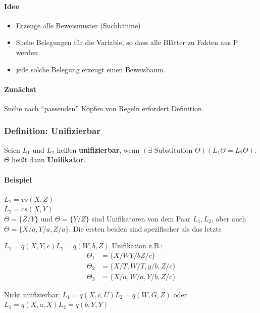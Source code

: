 \documentclass[12pt, a4paper]{article}
\begin{document}
\paragraph{Idee} 

\begin{itemize}
\item Erzeuge alle Beweismuster (Suchbäume)
\item Suche Belegungen für die Variable, so dass alle Blätter zu Fakten aus P werden
\item jede solche Belegung erzeugt einen Beweisbaum.
\end{itemize}

\paragraph{Zunächst} Suche nach ``passenden'' Köpfen von Regeln erfordert Definition.

\subsubsection*{Definition: Unifizierbar}

Seien $L_1$ und $L_2$ heißen \textbf{unifizierbar}, wenn $(\exists \text{ Substitution } \Theta)(L_1\Theta = L_2\Theta)$. $\Theta$ heißt dann \textbf{Unifikator}.

\paragraph{Beispiel}

$L_1 = vs(X, Z)$ \\
$L_2 = cs(X, Y)$ \\
$\Theta = \{ Z / Y \}$ und $\Theta = \{ Y / Z \}$ sind Unifikatoren von dem Paar $L_1, L_2$, aber auch $\Theta = \{ X/a, Y/a, Z/a \}$. Die ersten beiden sind spezifischer als das letzte

$L_1 = q(X, Y ,c) L_2 = q(W, b, Z)$
Unifikation z.B.:
\begin{equation}
\begin{split}
\Theta_1 &= \{ X/W Y/b Z/c \} \\
\Theta_2 &= \{ X/T, W/T, y/b, Z/c \} \\
\Theta_3 &= \{ X/a, W/a, Y/b, Z/c\}
\end{split}
\end{equation}

Nicht unifizierbar:
$L_1 = q(X, c, U) L_2 = q(W, G, Z)$ oder $L_1 = q(X, a, X) L_2 = q(b, Y, Y)$
\end{document}
